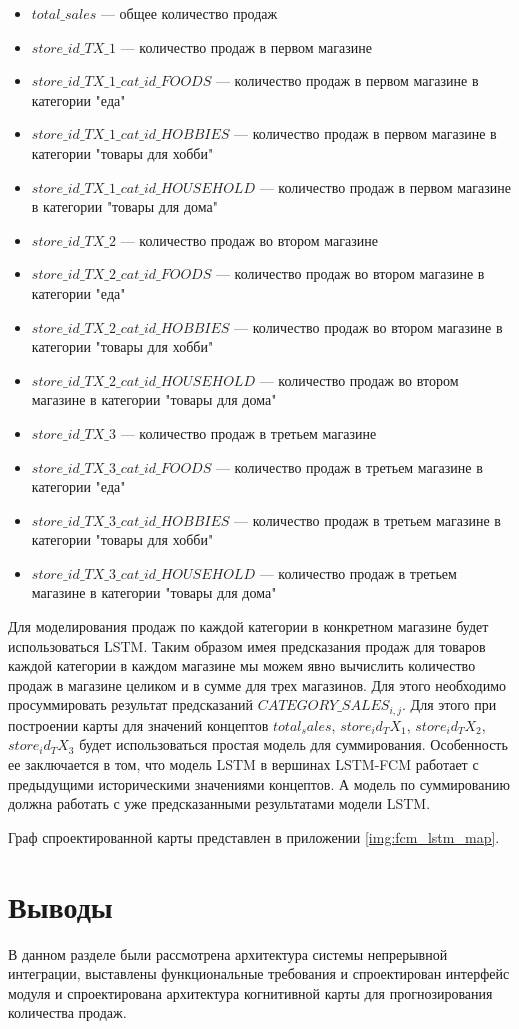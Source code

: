 \begin{itemize}
	\item $ total\_sales $ --- общее количество продаж
	\item $ store\_id\_TX\_1 $ --- количество продаж в первом магазине
	\item $ store\_id\_TX\_1\_cat\_id\_FOODS $ --- количество продаж в первом магазине в категории "еда"
	\item $ store\_id\_TX\_1\_cat\_id\_HOBBIES $ --- количество продаж в первом магазине в категории "товары для хобби"
	\item $ store\_id\_TX\_1\_cat\_id\_HOUSEHOLD $ --- количество продаж в первом магазине в категории "товары для дома"
	\item $ store\_id\_TX\_2 $ --- количество продаж во втором магазине
	\item $ store\_id\_TX\_2\_cat\_id\_FOODS $ --- количество продаж во втором магазине в категории "еда"
	\item $ store\_id\_TX\_2\_cat\_id\_HOBBIES $ --- количество продаж во втором магазине в категории "товары для хобби"
	\item $ store\_id\_TX\_2\_cat\_id\_HOUSEHOLD $ --- количество продаж во втором магазине в категории "товары для дома"
	\item $ store\_id\_TX\_3 $ --- количество продаж в третьем магазине
	\item $ store\_id\_TX\_3\_cat\_id\_FOODS $     --- количество продаж в третьем магазине в категории "еда"
	\item $ store\_id\_TX\_3\_cat\_id\_HOBBIES $   --- количество продаж в третьем магазине в категории "товары для хобби"
	\item $ store\_id\_TX\_3\_cat\_id\_HOUSEHOLD $ --- количество продаж в третьем магазине в категории "товары для дома"
\end{itemize}

Для моделирования продаж по каждой категории в конкретном магазине
будет использоваться LSTM.
Таким образом имея предсказания продаж для товаров каждой категории в каждом магазине
мы можем явно вычислить количество продаж в магазине целиком и в сумме для трех магазинов.
Для этого необходимо просуммировать результат предсказаний  $ CATEGORY\_SALES_{i,j} $.
Для этого при построении карты для значений концептов
$ total_sales $, $ store_id_TX_1 $, $ store_id_TX_2 $, $store_id_TX_3$
будет использоваться простая модель для суммирования.
Особенность ее заключается в том, что модель LSTM в вершинах LSTM-FCM работает
с предыдущими историческими значениями концептов. А модель по суммированию должна работать
с уже предсказанными результатами модели LSTM.

Граф спроектированной карты представлен в приложении \ref{img:fcm_lstm_map}.

\section{Выводы}

В данном разделе были рассмотрена архитектура системы
непрерывной интеграции, выставлены функциональные требования
и спроектирован интерфейс модуля и спроектирована архитектура
когнитивной карты для прогнозирования количества продаж.